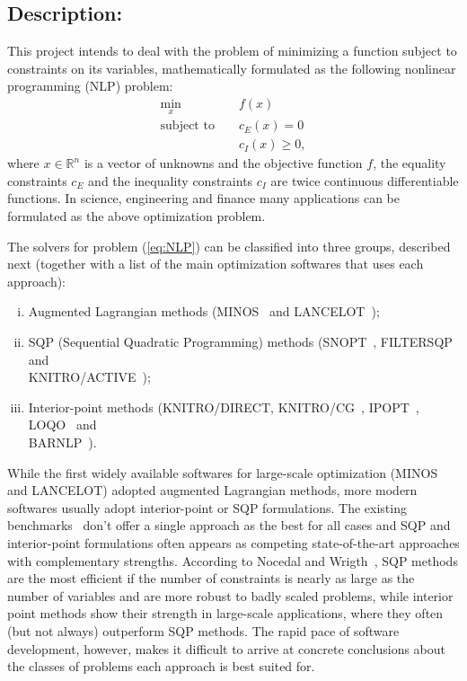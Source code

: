 \documentclass[11pt]{article}
\begin{document}
\subsection*{Description:}

This project intends to deal with the problem of minimizing a function
subject to constraints on its variables, mathematically formulated as
the following nonlinear programming (NLP) problem:
%
\begin{eqnarray}
  \label{eq:NLP}
   \min_x && f(x)\\\nonumber
  \text{subject to } && c_E(x) = 0 \\\nonumber
  && c_I(x) \ge 0,
\end{eqnarray}
%
where $x\in \mathbb{R}^n$ is a vector of unknowns and the objective function $f$,
the equality constraints $c_E$ and the inequality constraints $c_I$ are twice continuous
differentiable functions. In science, engineering and finance
many applications can be formulated as the above optimization problem.

The solvers for problem (\ref{eq:NLP}) can be
classified into three groups, described next (together with a list
of the main optimization softwares that uses each approach): 
%
\begin{enumerate}[(i)]
\item Augmented Lagrangian methods (MINOS~\cite{murtagh1983minos}
  and LANCELOT~\cite{conn1992lancelot});
\item SQP (Sequential Quadratic Programming) methods (SNOPT~\cite{gill2005snopt}, 
FILTERSQP~\cite{fletcher1998user} and \\KNITRO/ACTIVE~\cite{byrd2006knitro});
\item Interior-point methods (KNITRO/DIRECT,
  KNITRO/CG~\cite{byrd2006knitro}, IPOPT~\cite{wachter2006implementation},
  LOQO~\cite{vanderbei1999loqo} and \\BARNLP~\cite{barnlp2000boing}).
\end{enumerate}
%
While the first widely available softwares for large-scale optimization
(MINOS and LANCELOT) adopted augmented Lagrangian methods, more
modern softwares usually adopt interior-point or SQP formulations. The existing
benchmarks~\cite{morales2003assessing, benson2003comparative, dolan2006optimality}
don't offer a single approach as the best for all cases and SQP and interior-point
formulations often appears as competing state-of-the-art approaches with
complementary strengths. According to Nocedal and Wrigth~\cite[p.560 and p.592]{nocedal2006numerical},
SQP methods are the most efficient if the number of constraints is nearly as large
as the number of variables and are more robust to badly scaled problems,
while interior point methods show their strength in large-scale applications,
where they often (but not always) outperform SQP methods. The rapid pace of software
development, however,  makes it difficult to arrive at concrete conclusions about
the classes of problems each approach is best suited for.
\end{document}
